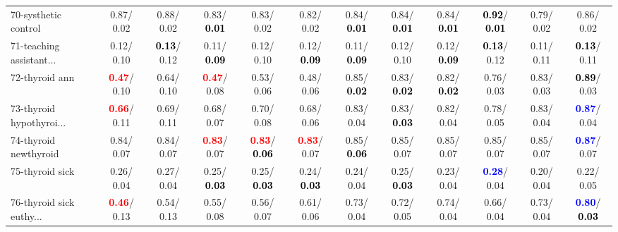 \begin{table}[h]
\begin{center}
{\begin{tabular}{lc|c|c|c|c|c|c|c|c|c|c}
70-systhetic control &   0.87/  0.02 &   0.88/  0.02 &   0.83/\textcolor{black}{\textbf{  0.01}} &   0.83/  0.02 &   0.82/  0.02 &   0.84/\textcolor{black}{\textbf{  0.01}} &   0.84/\textcolor{black}{\textbf{  0.01}} &   0.84/\textcolor{black}{\textbf{  0.01}} & \textcolor{black}{\textbf{  0.92}}/\textcolor{black}{\textbf{  0.01}} &   0.79/  0.02 &   0.86/  0.02 \\
71-teaching assistant... &   0.12/  0.10 & \textcolor{black}{\textbf{  0.13}}/  0.12 &   0.11/\textcolor{black}{\textbf{  0.09}} &   0.12/  0.10 &   0.12/\textcolor{black}{\textbf{  0.09}} &   0.11/\textcolor{black}{\textbf{  0.09}} &   0.12/  0.10 &   0.12/\textcolor{black}{\textbf{  0.09}} & \textcolor{black}{\textbf{  0.13}}/  0.12 &   0.11/  0.11 & \textcolor{black}{\textbf{  0.13}}/  0.11 \\ \hline
72-thyroid ann & \textcolor{red}{\textbf{  0.47}}/  0.10 &   0.64/  0.10 & \textcolor{red}{\textbf{  0.47}}/  0.08 &   0.53/  0.06 &   0.48/  0.06 &   0.85/\textcolor{black}{\textbf{  0.02}} &   0.83/\textcolor{black}{\textbf{  0.02}} &   0.82/\textcolor{black}{\textbf{  0.02}} &   0.76/  0.03 &   0.83/  0.03 & \textcolor{black}{\textbf{  0.89}}/  0.03 \\
73-thyroid hypothyroi... & \textcolor{red}{\textbf{  0.66}}/  0.11 &   0.69/  0.11 &   0.68/  0.07 &   0.70/  0.08 &   0.68/  0.06 &   0.83/  0.04 &   0.83/\textcolor{black}{\textbf{  0.03}} &   0.82/  0.04 &   0.78/  0.05 &   0.83/  0.04 & \textcolor{blue}{\textbf{  0.87}}/  0.04 \\
74-thyroid newthyroid &   0.84/  0.07 &   0.84/  0.07 & \textcolor{red}{\textbf{  0.83}}/  0.07 & \textcolor{red}{\textbf{  0.83}}/\textcolor{black}{\textbf{  0.06}} & \textcolor{red}{\textbf{  0.83}}/  0.07 &   0.85/\textcolor{black}{\textbf{  0.06}} &   0.85/  0.07 &   0.85/  0.07 &   0.85/  0.07 &   0.85/  0.07 & \textcolor{blue}{\textbf{  0.87}}/  0.07 \\
75-thyroid sick &   0.26/  0.04 &   0.27/  0.04 &   0.25/\textcolor{black}{\textbf{  0.03}} &   0.25/\textcolor{black}{\textbf{  0.03}} &   0.24/\textcolor{black}{\textbf{  0.03}} &   0.24/  0.04 &   0.25/\textcolor{black}{\textbf{  0.03}} &   0.23/  0.04 & \textcolor{blue}{\textbf{  0.28}}/  0.04 &   0.20/  0.04 &   0.22/  0.05 \\
76-thyroid sick euthy... & \textcolor{red}{\textbf{  0.46}}/  0.13 &   0.54/  0.13 &   0.55/  0.08 &   0.56/  0.07 &   0.61/  0.06 &   0.73/  0.04 &   0.72/  0.05 &   0.74/  0.04 &   0.66/  0.04 &   0.73/  0.04 & \textcolor{blue}{\textbf{  0.80}}/\textcolor{black}{\textbf{  0.03}} \\

\end{tabular}}
\end{center}
\end{table}
